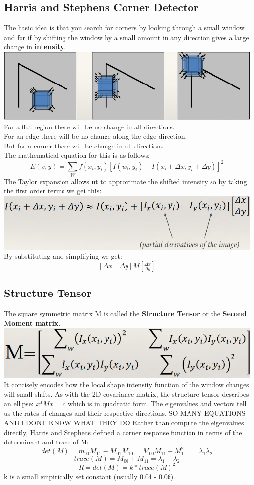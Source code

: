 \documentclass{article}
\begin{document}
	\subsection{Harris and Stephens Corner Detector}
	The basic idea is that you search for corners by looking through a small window and for if by shifting the window by a small amount in any direction gives a large change in \textbf{intensity}.\\
	\includegraphics[width=\linewidth]{corner_shift}
	For a flat region there will be no change in all directions.\\
	For an edge there will be no change along the edge direction.\\
	But for a corner there will be change in all directions.\\
	The mathematical equation for this is as follows:
	$$E(x,y)=\sum_Wf(x_i,y_i)[I(w_i,y_i)-I(x_i+\Delta x,y_i+\Delta y)]^2$$
	The Taylor expansion allows ut to approximate the shifted intensity so by taking the first order terms we get this:\\
	\includegraphics[width=\linewidth]{harris_math}
	By substituting and simplifying we get:
	$$[\Delta x \quad \Delta y]M[_{\Delta y}^{\Delta x}]$$
	\subsection{Structure Tensor}
	The square symmetric matrix M is called the \textbf{Structure Tensor} or the \textbf{Second Moment matrix}.\\
	\includegraphics[width=\linewidth]{structure_tensor}
	It concisely encodes how the local shape intensity function of the window changes will small shifts. As with the 2D covariance matrix, the structure tensor describes an ellipse: $x^TMx=c$ which is in quadratic form. The eigenvalues and vectors tell us the rates of changes and their respective directions.
	SO MANY EQUATIONS AND i DONT KNOW WHAT THEY DO
	Rather than compute the eigenvalues directly, Harris and Stephens defined a corner response function in terms of the determinant and trace of M:
	$$det(M) = m_{00}M_{11}-M_{01}M_{10}=M_{00}M_{11}-M_{1-}^2 = \lambda_1\lambda_2$$
	$$trace(M) = M_{00}+M_{11}=\lambda_1+\lambda_2$$
	$$R=det(M)=k*trace(M)^2$$
	k is a small empirically set constant (usually 0.04 - 0.06)
\end{document}
